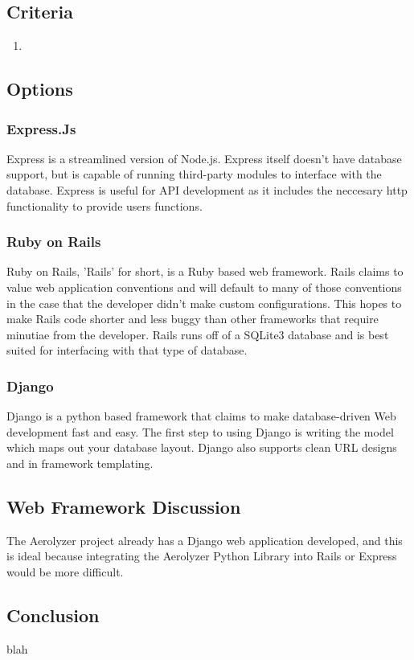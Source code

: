 \documentclass[onecolumn, draftclsnofoot,10pt, compsoc]{IEEEtran}
\begin{document}
\begin{singlespace}
\subsection{Criteria}
\begin{enumerate}
\item
\end{enumerate}
\subsection{Options}
\subsubsection{Express.Js}
Express is a streamlined version of Node.js.
Express itself doesn't have database support, but is capable of running third-party modules to interface with the database.
Express is useful for API development as it includes the neccesary http functionality to provide users functions.
\subsubsection{Ruby on Rails}
 Ruby on Rails, 'Rails' for short, is a Ruby based web framework.
Rails claims to value web application conventions and will default to many of those conventions in the case that the developer didn't make custom configurations.
This hopes to make Rails code shorter and less buggy than other frameworks that require minutiae from the developer.
Rails runs off of a SQLite3 database and is best suited for interfacing with that type of database.
\subsubsection{Django}
Django is a python based framework that claims to make database-driven Web development fast and easy.
The first step to using Django is writing the model which maps out your database layout.
Django also supports clean URL designs and in framework templating.
\subsection{Web Framework Discussion}
The Aerolyzer project already has a Django web application developed, and this is ideal because integrating the Aerolyzer Python Library into Rails or Express would be more difficult. 
\subsection{Conclusion}
blah


\end{singlespace}
\end{document}
